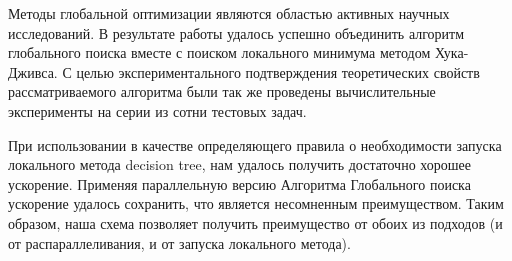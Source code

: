 \documentclass{svproc}
\begin{document}
Методы глобальной оптимизации являются областью активных научных исследований.  В результате работы удалось успешно объединить алгоритм глобального поиска вместе с поиском локального минимума методом Хука-Дживса. С целью экспериментального подтверждения теоретических свойств рассматриваемого алгоритма были так же проведены вычислительные эксперименты на серии из сотни тестовых задач. 

При использовании в качестве определяющего правила о необходимости запуска локального метода decision tree, нам удалось получить достаточно хорошее ускорение. Применяя параллельную версию Алгоритма Глобального поиска ускорение удалось сохранить, что является несомненным преимуществом. Таким образом, наша схема позволяет получить преимущество от обоих из подходов (и от распараллеливания, и от запуска локального метода).
\end{document}

